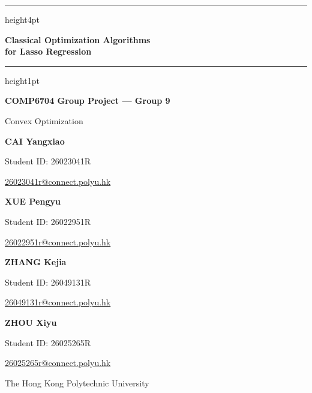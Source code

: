 \documentclass[10pt,letterpaper]{article}
\begin{document}
\begin{center}
\hrule height4pt\vspace{.15in}
{\fontsize{17}{20}\selectfont\bfseries Classical Optimization Algorithms\\for Lasso Regression\par}
\vspace{5pt}{\large A Four-Solver Review and Empirical Comparison\par}
\vspace{.12in}\hrule height1pt\vspace{10pt}
{\bfseries COMP6704 Group Project --- Group 9\par}
{Convex Optimization\par}\vspace{9pt}
\begin{minipage}[t]{.48\linewidth}\centering\small
\textbf{CAI Yangxiao}\par Student ID: 26023041R\par
\href{mailto:26023041r@connect.polyu.hk}{26023041r@connect.polyu.hk}
\end{minipage}\hfill
\begin{minipage}[t]{.48\linewidth}\centering\small
\textbf{XUE Pengyu}\par Student ID: 26022951R\par
\href{mailto:26022951r@connect.polyu.hk}{26022951r@connect.polyu.hk}
\end{minipage}\par\vspace{7pt}
\begin{minipage}[t]{.48\linewidth}\centering\small
\textbf{ZHANG Kejia}\par Student ID: 26049131R\par
\href{mailto:26049131r@connect.polyu.hk}{26049131r@connect.polyu.hk}
\end{minipage}\hfill
\begin{minipage}[t]{.48\linewidth}\centering\small
\textbf{ZHOU Xiyu}\par Student ID: 26025265R\par
\href{mailto:26025265r@connect.polyu.hk}{26025265r@connect.polyu.hk}
\end{minipage}\par\vspace{5pt}
The Hong Kong Polytechnic University
\end{center}
\end{document}
